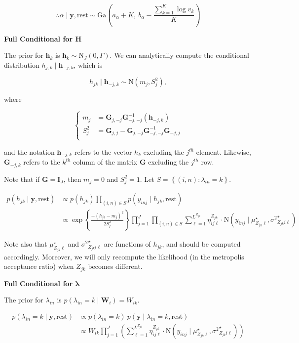 \documentclass[12pt,]{article}
\newcommand{\p}[1]{\left(#1\right)}
\newcommand{\bc}[1]{ \left\{#1\right\} }
\newcommand{\N}{ \mathcal{N} }
\newcommand{\I}{\mathrm{\mathbf{I}}}
\def\N{\text{N}}
\def\G{\text{Ga}}
\def\lin{\lambda_{in}}
\def\y{\bm{y}}
\def\mus{\mu^\star}
\def\sss{{\sigma^2}^\star}
\def\rest{\text{rest}}
\def\h{\bm{h}}
\begin{document}
\[
\therefore \alpha \mid \y, \rest \sim 
\G\p{a_\alpha + K,~ b_\alpha - \frac{\sum_{k=1}^K \log v_k}{K}}
\]
\vspace{2em}


\textbf{Full Conditional for $\bm H$}

The prior for \(\h_k\) is \(\h_k \sim \N_J(0, \Gamma)\). We can
analytically compute the conditional distribution
\(h_{j,k} \mid \h_{-j,k}\), which is

\[
h_{jk}  \mid \h_{-j,k} \sim \N(m_j, S^2_j),
\]

where

\[
\begin{cases}
m_j &= \bm G_{j,-j} \bm G_{-j,-j}^{-1}(\h_{-j,k})\\
S_j^2 &= \bm G_{j,j} - \bm G_{j,-j}\bm G_{-j,-j}^{-1}\bm G_{-j,j}\\
\end{cases}
\]

and the notation \(\h_{-j,k}\) refers to the vector \(h_k\) excluding
the \(j^{th}\) element. Likewise, \(\bm G_{-j,k}\) refers to the
\(k^{th}\) column of the matrix \(\bm G\) excluding the \(j^{th}\) row.

Note that if \(\bm G = \I_J\), then \(m_j=0\) and \(S_j^2 = 1\). Let
\(S = \bc{(i,n)\colon \lin=k}\).

\begin{align*}
p(h_{jk} \mid \y, \rest)  &\propto p(h_{jk}) \prod_{(i,n) \in S} p(y_{inj} \mid
  h_{jk}, \rest) \\
%
&\propto
\exp\bc{\frac{-(h_{jk} - m_j)^2}{2S_j^2}}
 \prod_{j=1}^J \prod_{(i,n)\in S}
\sum_{\ell=1}^{L^{Z_{jk}}} \eta^{Z_{jk}}_{ij\ell} \cdot
\N(y_{inj} \mid \mus_{Z_{jk}\ell}, \sss_{Z_{jk}i\ell})
\end{align*}


Note also that \(\mus_{Z_{jk}\ell}\) and \(\sss_{Z_{jk}i\ell}\) are
functions of \(h_{jk}\), and should be computed accordingly. Moreover,
we will only recompute the likelihood (in the metropolis acceptance
ratio) when \(Z_{jk}\) becomes different.  
\vspace{2em}


\textbf{Full Conditional for $\bm \lambda$}

The prior for \(\lin\) is \(p(\lin = k \mid \bm W_i) = W_{ik}\).

\begin{align*}
p(\lin=k\mid \y,\rest) &\propto p(\lin=k) ~ p(\y \mid \lin=k, \rest) \\
&\propto W_{ik}
\prod_{j=1}^J 
\p{
  \sum_{\ell=1}^{L^{Z_{jk}}} \eta^{Z_{jk}}_{ij\ell} \cdot
  \N(y_{inj} \mid 
  \mus_{Z_{jk}\ell}, \sss_{Z_{jk}i\ell})
}\\
\end{align*}
\end{document}
